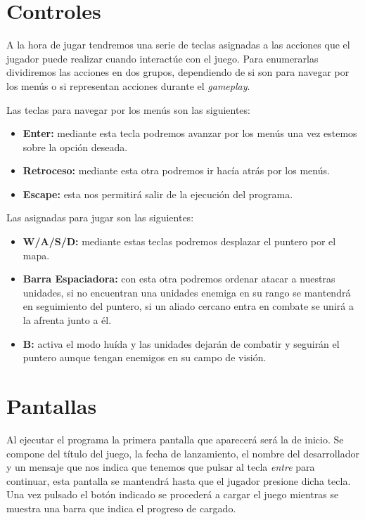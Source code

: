 \section{Controles}
A la hora de jugar tendremos una serie de teclas asignadas a las acciones que el
jugador puede realizar cuando interactúe con el juego. Para enumerarlas dividiremos las
acciones en dos grupos, dependiendo de si son para navegar por los menús o si
representan acciones durante el \textit{gameplay}.

Las teclas para navegar por los menús son las siguientes:

\begin{itemize}
	\item \textbf{Enter:} mediante esta tecla podremos avanzar por los menús una vez estemos sobre la opción deseada.
	\item \textbf{Retroceso:} mediante esta otra podremos ir hacía atrás por los menús.
	\item \textbf{Escape:} esta nos permitirá salir de la ejecución del programa.
\end{itemize}

Las asignadas para jugar son las siguientes:

\begin{itemize}
	\item \textbf{W/A/S/D:} mediante estas teclas podremos desplazar el puntero por el mapa.
	\item \textbf{Barra Espaciadora:} con esta otra podremos ordenar atacar a nuestras unidades,
									  si no encuentran una unidades enemiga en su rango se mantendrá
									  en seguimiento del puntero, si un aliado cercano entra en combate
									  se unirá a la afrenta junto a él.
	\item \textbf{B:} activa el modo huída y las unidades dejarán de combatir y seguirán el
					  puntero aunque tengan enemigos en su campo de visión.									  
\end{itemize}

\section{Pantallas}
Al ejecutar el programa la primera pantalla que aparecerá será la de 
inicio. Se compone del título del juego, la fecha de lanzamiento,
el nombre del desarrollador y un mensaje que nos indica que tenemos que pulsar al tecla
\textit{entre} para continuar, esta pantalla se mantendrá hasta que el jugador presione
dicha tecla.\\
Una vez pulsado el botón indicado se procederá a cargar el juego mientras se muestra
una barra que indica el progreso de cargado.

